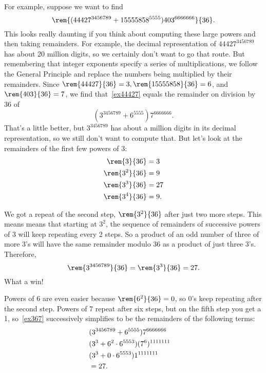 For example, suppose we want to find
\begin{equation}\label{ex44427}
\rem{(44427^{3456789} + 15555858^{5555})403^{6666666}}{36}.
\end{equation}
This looks really daunting if you think about computing these large
powers and then taking remainders.  For example, the decimal
representation of $44427^{3456789}$ has about 20 million digits, so we
certainly don't want to go that route.  But remembering that integer
exponents specify a series of multiplications, we follow the General
Principle and replace the numbers being multiplied by their
remainders.  Since $\rem{44427}{36} = 3, \rem{15555858}{36} = 6$, and
$\rem{403}{36} = 7$, we find that~\eqref{ex44427} equals the remainder
on division by 36 of
\begin{equation}\label{ex367}
(3^{3456789} + 6^{5555})7^{6666666}.
\end{equation}
That's a little better, but $3^{3456789}$ has about a million digits
in its decimal representation, so we still don't want to compute that.
But let's look at the remainders of the first few powers of 3:
\begin{align*}
\rem{3}{36} & = 3\\
\rem{3^2}{36} & = 9\\
\rem{3^3}{36} & = 27\\
\rem{3^4}{36} & = 9.
\end{align*}

We got a repeat of the second step, $\rem{3^2}{36}$ after just two
more steps.  This means means that starting at $3^2$, the sequence of
remainders of successive powers of 3 will keep repeating every 2
steps.  So a product of an odd number of three of more 3's will have
the same remainder modulo 36 as a product of just three 3's.
Therefore,
\[
\rem{3^{3456789}}{36} = \rem{3^3}{36} = 27.
\]
What a win!

Powers of 6 are even easier because $\rem{6^2}{36} = 0$, so 0's keep
repeating after the second step.  Powers of 7 repeat after six steps,
but on the fifth step you get a 1, so~\eqref{ex367} successively
simplifies to be the remainders of the following terms:
\begin{align*}
\lefteqn{(3^{3456789} + 6^{5555})7^{6666666}}\\
   & (3^3 + 6^2 \cdot 6^{5553})(7^6)^{1111111}\\
   & (3^3 + 0 \cdot 6^{5553})1^{1111111}\\
   & = 27.
\end{align*}

